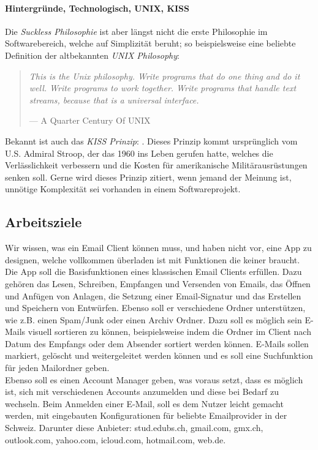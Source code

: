 \documentclass[a4paper,11pt]{article}
\newenvironment{nicequote}[2]{
    \begin{center}\begin{quote}\textit{#1}\\\par\raggedleft--- {#2}
    }{
    \end{quote}\end{center}
}
\begin{document}
\paragraph{Hintergründe, Technologisch, UNIX, KISS}
Die \textit{Suckless Philosophie} ist aber längst nicht die erste Philosophie im Softwarebereich, welche auf Simplizität beruht; so beispielsweise eine beliebte Definition der altbekannten \textit{UNIX Philosophy}:

\begin{nicequote}{This is the Unix philosophy. Write programs that do one thing and do it well. Write programs to work together. Write programs that handle text streams, because that is a universal interface.}{A Quarter Century Of UNIX \cite{salus1994}}
\end{nicequote}

Bekannt ist auch das \textit{KISS Prinzip}: . Dieses Prinzip kommt ursprünglich vom U.S. Admiral Stroop, der das  1960 ins Leben gerufen hatte, welches die Verlässlichkeit verbessern und die Kosten für amerikanische Militärausrüstungen senken soll. \cite{dalzell2009} Gerne wird dieses Prinzip zitiert, wenn jemand der Meinung ist, unnötige Komplexität sei vorhanden in einem Softwareprojekt.


\subsection{Arbeitsziele}

Wir wissen, was ein Email Client können muss, und haben nicht vor, eine App zu designen, welche vollkommen überladen ist mit Funktionen die keiner braucht.\\

Die App soll die Basisfunktionen eines klassischen Email Clients erfüllen. Dazu gehören das Lesen, Schreiben, Empfangen und Versenden von Emails, 
das Öffnen und Anfügen von Anlagen, die Setzung einer Email-Signatur und das Erstellen und Speichern von Entwürfen. 
Ebenso soll er verschiedene Ordner unterstützen, wie z.B. einen Spam/Junk oder einen Archiv Ordner. 
Dazu soll es möglich sein E-Mails visuell sortieren zu können, beispielsweise indem die Ordner im Client nach Datum des Empfangs oder dem Absender sortiert werden können. E-Mails sollen markiert, gelöscht und weitergeleitet werden können und es soll eine Suchfunktion für jeden Mailordner geben. \\

Ebenso soll es einen Account Manager geben, was voraus setzt, dass es möglich ist, sich mit verschiedenen 
Accounts anzumelden und diese bei Bedarf zu wechseln. Beim Anmelden einer E-Mail, soll es dem Nutzer leicht gemacht werden, mit eingebauten Konfigurationen für beliebte 
Emailprovider in der Schweiz. Darunter diese Anbieter: stud.edubs.ch, gmail.com, gmx.ch, outlook.com, yahoo.com, icloud.com, hotmail.com, web.de. \\
\end{document}
